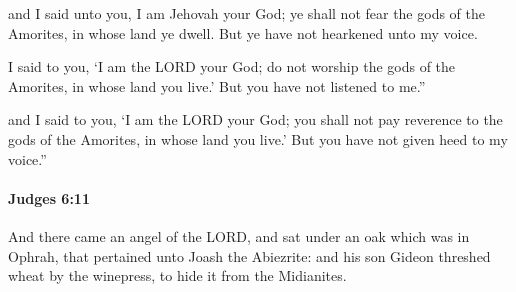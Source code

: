 			\begin{versebox}
					\item[BHS] 
					\item[ASV] and I said unto you, I am Jehovah your God; ye shall not fear the gods of the Amorites, in whose land ye dwell. But ye have not hearkened unto my voice.
					\item[NIV] I said to you, ‘I am the LORD your God; do not worship the gods of the Amorites, in whose land you live.’ But you have not listened to me.”
					\item[NRSV] and I said to you, ‘I am the LORD your God; you shall not pay reverence to the gods of the Amorites, in whose land you live.’ But you have not given heed to my voice.”
			\end{versebox}

		\paragraph{Judges 6:11} %
			\label{JUDGES-6-11}

			And there came an angel of the LORD, and sat under an oak which was in Ophrah, that pertained unto Joash the Abiezrite: and his son Gideon threshed wheat by the winepress, to hide it from the Midianites.

